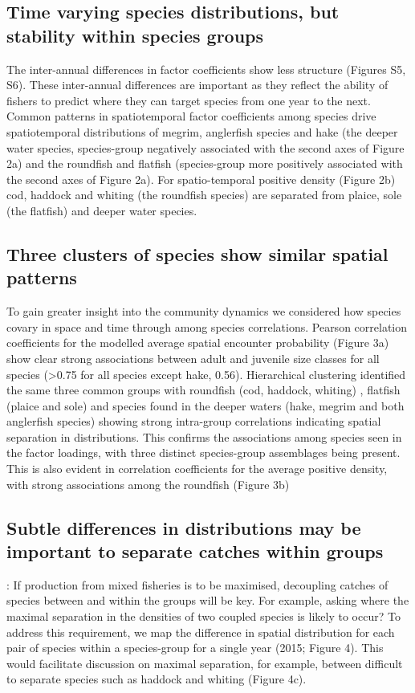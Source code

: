 \documentclass{nature}
\begin{document}
\begin{linenumbers}
    

 

\subsection{Time varying species distributions, but stability
		within species groups}  The inter-annual differences in factor
coefficients show less structure (Figures S5, S6). These inter-annual
differences are important as they reflect the ability of fishers to predict
where they can target species from one year to the next.  Common patterns in spatiotemporal factor coefficients
among species   drive spatiotemporal distributions of megrim,
anglerfish species and hake (the deeper water species, species-group
negatively associated with the second axes of Figure 2a) and the roundfish and
flatfish (species-group more positively associated with the second axes of
Figure 2a). For spatio-temporal positive density (Figure 2b) cod, haddock and
whiting (the roundfish species) are separated from plaice, sole (the flatfish)
and deeper water species.   

\subsection{Three clusters of species show similar spatial patterns}
To gain greater insight into the community
dynamics we considered how species covary in space and time through among
species correlations. Pearson correlation coefficients for the modelled average
spatial encounter probability (Figure 3a) show clear strong associations
between adult and juvenile size classes for all species (\textgreater 0.75 for
all species except hake, 0.56).   Hierarchical
clustering identified the same three common groups  with roundfish (cod,
haddock, whiting) , flatfish (plaice and sole)  and species found in the deeper
waters (hake, megrim and both anglerfish species)  showing strong intra-group correlations indicating
spatial separation in distributions. This confirms the associations among
species seen in the factor loadings, with three distinct species-group
assemblages being present.  This is also evident in correlation coefficients
for the average positive density, with strong associations among the roundfish
(Figure 3b) 




\subsection{Subtle differences in distributions may be important to separate
	catches within groups }: If production from
mixed fisheries is to be maximised, decoupling catches of species between and
within the groups will be key. For example, asking where the maximal separation
in the densities of two coupled species is likely to occur? To address this
requirement, we map the difference in spatial distribution  for each pair of species within a species-group for a single
year (2015; Figure 4). This would facilitate discussion on maximal separation,
for example, between difficult to separate species such as haddock and whiting
(Figure 4c).




\end{linenumbers}
\end{document}
